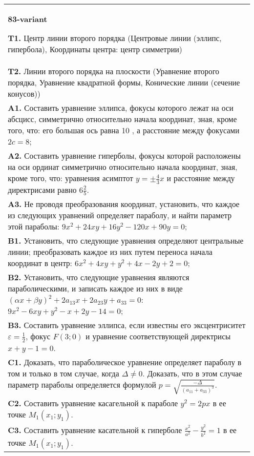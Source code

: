 \documentclass{article}
\begin{document}
\begin{tabular}{m{17cm}}
\textbf{83-variant}
\newline

\textbf{T1.} Центр линии второго порядка (Центровые линии (эллипс, гипербола), Координаты центра: центр симметрии) \\
\textbf{T2.} Линии второго порядка на плоскости (Уравнение второго порядка, Уравнение квадратной формы, Конические линии (сечение конусов)) \\
\textbf{A1.} Составить уравнение эллипса, фокусы которого лежат на оси абсцисс, симметрично относительно начала координат, зная, кроме того, что: его большая ось равна 10 , а расстояние между фокусами $2 c=8$; \\
\textbf{A2.} Составить уравнение гиперболы, фокусы которой расположены на оси ординат симметрично относительно начала координат, зная, кроме того, что: уравнения асимптот $y= \pm \frac{4}{3} x$ и расстояние между директрисами равно $6 \frac{2}{5}$. \\
\textbf{A3.} Не проводя преобразования координат, установить, что каждое из следующих уравнений определяет параболу, и найти параметр этой параболы: $9 x^2+24 x y+16 y^2-120 x+90 y=0$; \\
\textbf{B1.} Установить, что следующие уравнения определяют центральные линии; преобразовать каждое из них путем переноса начала координат в центр: $6 x^2+4 x y+y^2+4 x-2 y+2=0$; \\
\textbf{B2.} Установить, что следующие уравнения являются параболическими, и записать каждое из них в виде $(\alpha x+\beta y)^2+2 a_{13} x+2 a_{23} y+a_{33}=0$: $9 x^2-6 x y+y^2-x+2 y-14=0$; \\
\textbf{B3.} Составить уравнение эллипса, если известны его эксцентриситет $\varepsilon=\frac{1}{2}$, фокус $F(3 ; 0)$ и уравнение соответствующей директрисы $x+y-1=0$. \\
\textbf{C1.} Доказать, что параболическое уравнение определяет параболу в том и только в том случае, когда $\Delta \neq 0$. Доказать, что в этом случае параметр параболы определяется формулой $p=\sqrt{\frac{-\Delta}{ (a_{11}+a_{33}) ^3}}$. \\
\textbf{C2.} Составить уравнение касагельной к параболе $y^2=2 p x$ в ее точке $M_1\left(x_1 ; y_1\right)$. \\
\textbf{C3.} Составить уравнение касательной к гиперболе $\frac{x^2}{a^2}-\frac{y^2}{b^2}=1$ в ее точке $M_1\left(x_1 ; y_1\right)$. \\

\end{tabular}
\vspace{1cm}
\end{document}
